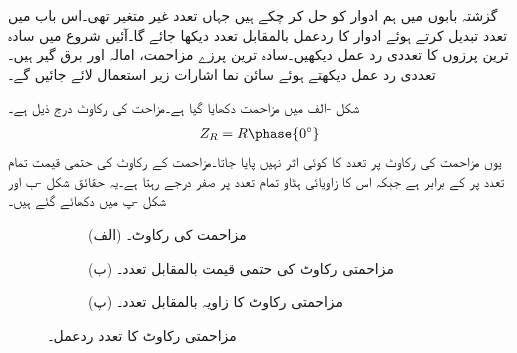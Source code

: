 گزشتہ بابوں میں ہم  ادوار کو حل کر چکے ہیں جہاں تعدد غیر متغیر تھی۔اس باب میں تعدد تبدیل کرتے ہوئے ادوار کا ردعمل بالمقابل تعدد دیکھا جائے گا۔آئیں شروع میں سادہ ترین پرزوں کا تعددی رد عمل دیکھیں۔سادہ ترین پرزے  مزاحمت، امالہ اور برق گیر ہیں۔تعددی رد عمل دیکھتے ہوئے سائن نما اشارات زیر استعمال لائے جائیں گے۔ 

شکل -الف میں مزاحمت دکھایا گیا ہے۔مزاحت کی رکاوٹ درج ذیل ہے۔
\begin{align}
Z_R=R\phase{0^{\circ}}
\end{align}
یوں مزاحمت کی رکاوٹ پر تعدد  کا کوئی اثر نہیں پایا جاتا۔مزاحمت کے رکاوٹ کی حتمی قیمت  تمام تعدد پر  کے برابر ہے جبکہ اس کا زاویائی ہٹاو  تمام تعدد پر صفر درجے رہتا ہے۔یہ حقائق شکل -ب اور شکل -پ میں دکھائے گئے ہیں۔
\begin{figure}
\centering
\begin{subfigure}{1\textwidth}
\centering
{}
\caption*{(الف) مزاحمت کی رکاوٹ۔}
\end{subfigure}
\begin{subfigure}{0.5\textwidth}
\centering
{}%
\caption*{(ب) مزاحمتی رکاوٹ کی حتمی قیمت بالمقابل تعدد۔}
\end{subfigure}%
\begin{subfigure}{0.5\textwidth}
\centering
{}%
\caption*{(پ) مزاحمتی رکاوٹ کا زاویہ بالمقابل تعدد۔}
\end{subfigure}%
\caption{مزاحمتی رکاوٹ کا تعدد ردعمل۔}
\label{شکل_تعددی_مزاحمتی_ردعمل}
\end{figure}

